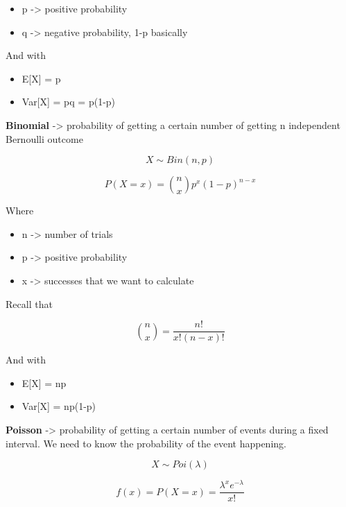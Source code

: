 \begin{itemize}
    \item p -> positive probability
    \item q -> negative probability, 1-p basically
\end{itemize}

And with
\begin{itemize}
    \item E[X] = p
    \item Var[X] = pq = p(1-p)
\end{itemize}


\textbf{Binomial} -> probability of getting a certain number of getting n independent Bernoulli outcome

\begin{equation}
    X \sim Bin(n, p)
\end{equation}

\begin{equation}
    P(X=x) = \binom{n}{x}p^x(1-p)^{n-x}
\end{equation}

Where
\begin{itemize}
    \item n -> number of trials
    \item p -> positive probability
    \item x -> successes that we want to calculate
\end{itemize}

Recall that

\begin{equation}
    \binom{n}{x} = \frac{n!}{x!(n-x)!}
\end{equation}

And with
\begin{itemize}
    \item E[X] = np
    \item Var[X] = np(1-p)
\end{itemize}


\textbf{Poisson} -> probability of getting a certain number of events during a fixed interval. We need to know the probability of the event happening.

\begin{equation}
    X \sim Poi(\lambda)
\end{equation}

\begin{equation}
    f(x) = P(X=x) = \frac{\lambda^xe^{-\lambda}}{x!}
\end{equation}

